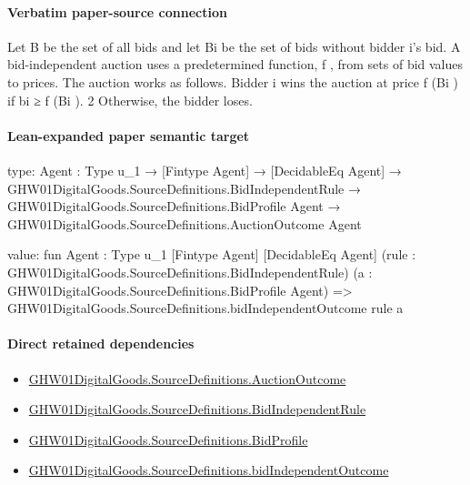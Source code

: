 \documentclass[10pt]{article}
\begin{document}
\paragraph{Verbatim paper-source connection}
\begin{ReviewVerbatim}
Let B be the set of all bids and let Bi be the set
of bids without bidder i’s bid. A bid-independent
auction uses a predetermined function, f , from sets
of bid values to prices. The auction works as follows.
Bidder i wins the auction at price f (Bi ) if bi ≥ f (Bi ).
2
Otherwise, the bidder loses.
\end{ReviewVerbatim}



\paragraph{Lean-expanded paper semantic target}
\begin{ReviewVerbatim}
type:
{Agent : Type u_1} →
  [Fintype Agent] →
    [DecidableEq Agent] →
      GHW01DigitalGoods.SourceDefinitions.BidIndependentRule →
        GHW01DigitalGoods.SourceDefinitions.BidProfile Agent → GHW01DigitalGoods.SourceDefinitions.AuctionOutcome Agent

value:
fun {Agent : Type u_1} [Fintype Agent] [DecidableEq Agent]
    (rule : GHW01DigitalGoods.SourceDefinitions.BidIndependentRule)
    (a : GHW01DigitalGoods.SourceDefinitions.BidProfile Agent) =>
  GHW01DigitalGoods.SourceDefinitions.bidIndependentOutcome rule a
\end{ReviewVerbatim}

\paragraph{Direct retained dependencies}
\begin{itemize}\raggedright
\item \hyperlink{paper-prerequisite-fc173e8d557afd08}{GHW01\allowbreak{}Digital\allowbreak{}Goods.\allowbreak{}Source\allowbreak{}Definitions.\allowbreak{}Auction\allowbreak{}Outcome}
\item \hyperlink{paper-prerequisite-7c4e01ff6844d269}{GHW01\allowbreak{}Digital\allowbreak{}Goods.\allowbreak{}Source\allowbreak{}Definitions.\allowbreak{}Bid\allowbreak{}Independent\allowbreak{}Rule}
\item \hyperlink{paper-prerequisite-ac8769d0dccf04f4}{GHW01\allowbreak{}Digital\allowbreak{}Goods.\allowbreak{}Source\allowbreak{}Definitions.\allowbreak{}Bid\allowbreak{}Profile}
\item \hyperlink{paper-prerequisite-f264be8ad03938a6}{GHW01\allowbreak{}Digital\allowbreak{}Goods.\allowbreak{}Source\allowbreak{}Definitions.\allowbreak{}bid\allowbreak{}Independent\allowbreak{}Outcome}
\end{itemize}
\end{document}
